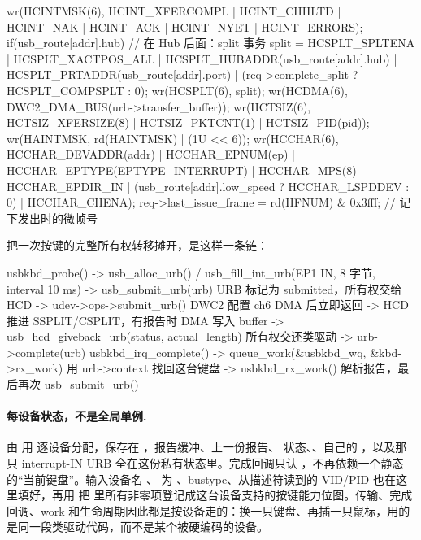\begin{ccode}
wr(HCINTMSK(6), HCINT_XFERCOMPL | HCINT_CHHLTD | HCINT_NAK |
                 HCINT_ACK | HCINT_NYET | HCINT_ERRORS);
if(usb_route[addr].hub)                        // 在 Hub 后面：split 事务
  split = HCSPLT_SPLTENA | HCSPLT_XACTPOS_ALL |
          HCSPLT_HUBADDR(usb_route[addr].hub) | HCSPLT_PRTADDR(usb_route[addr].port) |
          (req->complete_split ? HCSPLT_COMPSPLT : 0);
wr(HCSPLT(6), split);
wr(HCDMA(6),  DWC2_DMA_BUS(urb->transfer_buffer));
wr(HCTSIZ(6), HCTSIZ_XFERSIZE(8) | HCTSIZ_PKTCNT(1) | HCTSIZ_PID(pid));
wr(HAINTMSK, rd(HAINTMSK) | (1U << 6));
wr(HCCHAR(6), HCCHAR_DEVADDR(addr) | HCCHAR_EPNUM(ep) | HCCHAR_EPTYPE(EPTYPE_INTERRUPT) |
              HCCHAR_MPS(8) | HCCHAR_EPDIR_IN |
              (usb_route[addr].low_speed ? HCCHAR_LSPDDEV : 0) | HCCHAR_CHENA);
req->last_issue_frame = rd(HFNUM) & 0x3fff;    // 记下发出时的微帧号
\end{ccode}

把一次按键的完整所有权转移摊开，是这样一条链：

\begin{txtcode}
usbkbd_probe()
  -> usb_alloc_urb() / usb_fill_int_urb(EP1 IN, 8 字节, interval 10 ms)
  -> usb_submit_urb(urb)              URB 标记为 submitted，所有权交给 HCD
  -> udev->ops->submit_urb()          DWC2 配置 ch6 DMA 后立即返回
  -> HCD 推进 SSPLIT/CSPLIT，有报告时 DMA 写入 buffer
  -> usb_hcd_giveback_urb(status, actual_length)   所有权交还类驱动
  -> urb->complete(urb)               usbkbd_irq_complete()
  -> queue_work(&usbkbd_wq, &kbd->rx_work)   用 urb->context 找回这台键盘
  -> usbkbd_rx_work() 解析报告，最后再次 usb_submit_urb()
\end{txtcode}

\paragraph{每设备状态，不是全局单例.}  由  用  逐设备分配，保存在 ，报告缓冲、上一份报告、 状态、、自己的 ，以及那只 interrupt-IN URB 全在这份私有状态里。完成回调只认 ，不再依赖一个静态的“当前键盘”。输入设备名 、 为 、bustype、从描述符读到的 VID/PID 也在这里填好，再用  把  里所有非零项登记成这台设备支持的按键能力位图。传输、完成回调、work 和生命周期因此都是按设备走的：换一只键盘、再插一只鼠标，用的是同一段类驱动代码，而不是某个被硬编码的设备。


